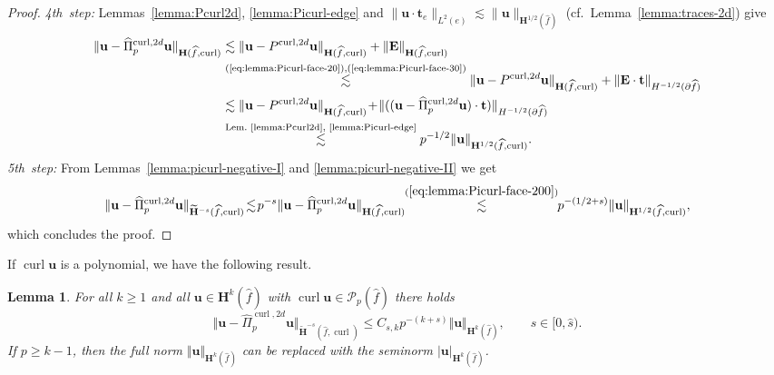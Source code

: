 \documentclass{article}
\newtheorem{lemma}[theorem]{Lemma}
\newcommand\neu[1]{{\color{red}#1}}
\newcommand{\hatPicurlcomtwod}{\widehat \Pi^{\operatorname*{curl},2d}_p}
\begin{document}
\begin{proof}
\emph{4th~step:} 
Lemmas~\ref{lemma:Pcurl2d}, \ref{lemma:Picurl-edge} and $\|{\mathbf u} \cdot {\mathbf t}_e \|_{L^2(e)} 
\lesssim \|{\mathbf u}\|_{{\mathbf H}^{1/2}(\widehat f)}$ (cf.~Lemma~\ref{lemma:traces-2d}) give
\begin{align}
\nonumber 
\Vert{\mathbf{u}}-\hatPicurlcomtwod{\mathbf{u}}%
\Vert_{\mathbf{H}(\widehat{f},\operatorname{curl})}  &  \lesssim\Vert{\mathbf{u}}%
-P^{\operatorname*{curl},2d}{\mathbf{u}}\Vert_{\mathbf{H}(\widehat{f},\operatorname{curl})}%
+\Vert{\mathbf{E}}\Vert_{\mathbf{H}(\widehat{f},\operatorname{curl})} \\
\nonumber 
& \overset{\text{(\ref{eq:lemma:Picurl-face-20}),(\ref{eq:lemma:Picurl-face-30}%
)}}{\lesssim}\Vert{\mathbf{u}}-P^{\operatorname*{curl},2d}{\mathbf{u}}%
\Vert_{\mathbf{H}(\widehat{f},\operatorname{curl})}+\Vert{\mathbf{E}}\cdot\mathbf{t}\Vert
_{H^{-1/2}(\partial \widehat{f})}\\
\nonumber 
&  \lesssim\Vert{\mathbf{u}}-P^{\operatorname*{curl},2d}{\mathbf{u}}%
\Vert_{\mathbf{H}(\widehat{f},\operatorname{curl})}\!+\!\Vert(({\mathbf{u}}-\hatPicurlcomtwod{\mathbf{u}})\cdot\mathbf{t})\Vert_{H^{-1/2}(\partial
\widehat{f})} \\
\label{eq:lemma:Picurl-face-200}%
& \overset{\text{Lem.~\ref{lemma:Pcurl2d},~\ref{lemma:Picurl-edge}%
}}{\lesssim}p^{-1/2}\Vert{\mathbf{u}}\Vert_{{\mathbf{H}}^{1/2}(\widehat{f},\operatorname*{curl})}.
\end{align}
\emph{5th~step:} 
{}From Lemmas~\ref{lemma:picurl-negative-I} and \ref{lemma:picurl-negative-II} 
we get 
\begin{align*}
\Vert{\mathbf{u}}-\hatPicurlcomtwod{\mathbf{u}}\Vert_{\widetilde{\mathbf{H}}^{-s}(\widehat{f},\operatorname{curl})} \!\lesssim\! p^{-s} \Vert{\mathbf{u}}-\hatPicurlcomtwod{\mathbf{u}}%
\Vert_{\mathbf{H}(\widehat{f},\operatorname{curl})} 
\!\!\stackrel{(\ref{eq:lemma:Picurl-face-200})}{\lesssim}\!\!
p^{-(1/2+s)}%
\Vert{\mathbf{u}}\Vert_{\mathbf{H}^{1/2}(\widehat{f},\operatorname*{curl})},
\end{align*}
which concludes the proof.
\end{proof}

If $\operatorname{curl}{\mathbf u}$ is a polynomial, we have the following result.

\begin{lemma}
\label{lemma:better-regularity-2d}
For all $k\geq1$ and
all ${\mathbf{u}}\in{\mathbf{H}}^{k}(\widehat{f})$ with $\operatorname*{curl}{\mathbf{u}}\in{\mathcal{P}}_{p}(\widehat{f})$ there holds
\begin{equation}
\Vert{\mathbf{u}}-\hatPicurlcomtwod{\mathbf{u}}%
\Vert_{\widetilde{\mathbf{H}}^{-s}(\widehat{f},\operatorname{curl})}\leq C_{s,k}p^{-(k+s)}\Vert{\mathbf{u}}\Vert
_{\mathbf{H}^{k}(\widehat{f})}, \qquad s\in [0,\widehat{s}).
\label{eq:proposition:better-regularity-2d}%
\end{equation}
If $p\geq k-1$, then the full norm $\Vert{\mathbf{u}}\Vert_{{\mathbf{H}}%
^{k}(\widehat{f})}$ can be replaced with the seminorm $|{\mathbf{u}%
}|_{{\mathbf{H}}^{k}(\widehat{f})}$.
\end{lemma}
\end{document}
